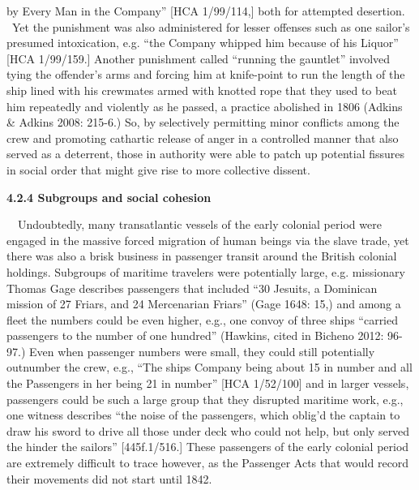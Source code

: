 \begin{styleStandard}
by Every Man in the Company” [HCA 1/99/114,] both for attempted desertion. \ Yet the punishment was also administered for lesser offenses such as one sailor’s presumed intoxication, e.g. “the Company whipped him because of his Liquor” [HCA 1/99/159.] Another punishment called “running the gauntlet” involved tying the offender’s arms and forcing him at knife-point to run the length of the ship lined with his crewmates armed with knotted rope that they used to beat him repeatedly and violently as he passed, a practice abolished in 1806 (Adkins \& Adkins 2008: 215-6.) So, by selectively permitting minor conflicts among the crew and promoting cathartic release of anger in a controlled manner that also served as a deterrent, those in authority were able to patch up potential fissures in social order that might give rise to more collective dissent. 
\end{styleStandard}


\begin{styleStandard}
\textbf{4.2.4 Subgroups and social cohesion}
\end{styleStandard}


\begin{styleStandard}
\ \ Undoubtedly, many transatlantic vessels of the early colonial period were engaged in the massive forced migration of human beings via the slave trade, yet there was also a brisk business in passenger transit around the British colonial holdings. Subgroups of maritime travelers were potentially large, e.g. missionary Thomas Gage describes passengers that included “30 Jesuits, a Dominican mission of 27 Friars, and 24 Mercenarian Friars” (Gage 1648: 15,) and among a fleet the numbers could be even higher, e.g., one convoy of three ships “carried passengers to the number of one hundred” (Hawkins, cited in Bicheno 2012: 96-97.) Even when passenger numbers were small, they could still potentially outnumber the crew, e.g., “The ships Company being about 15 in number and all the Passengers in her being 21 in number” [HCA 1/52/100] and in larger vessels, passengers could be such a large group that they disrupted maritime work, e.g., one witness describes “the noise of the passengers, which oblig’d the captain to draw his sword to drive all those under deck who could not help, but only served the hinder the sailors” [445f.1/516.] These passengers of the early colonial period are extremely difficult to trace however, as the Passenger Acts that would record their movements did not start until 1842.
\end{styleStandard}


